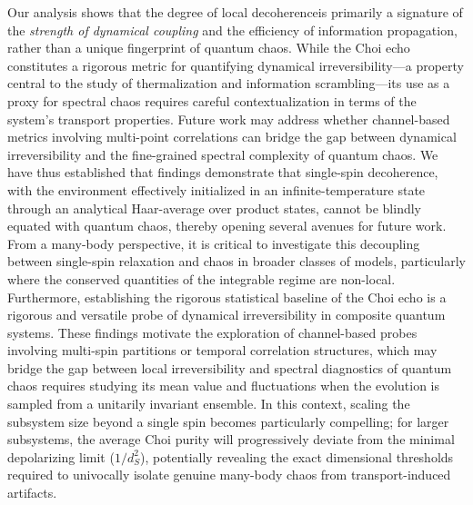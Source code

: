 \documentclass[pra,twocolumn,aps,showpacs,superscriptaddress,longbibliography]{revtex4-2}%
\providecommand{\DIFadd}[1]{{\protect\color{blue} \sf #1}} %
\providecommand{\DIFdel}[1]{{\protect\color{red} \scriptsize #1}} %
\providecommand{\DIFaddbegin}{} %
\providecommand{\DIFaddend}{} %
\providecommand{\DIFdelbegin}{} %
\providecommand{\DIFdelend}{} %
\begin{document}
Our \DIFdelbegin \DIFdel{analysis shows that the degree of local decoherenceis primarily a signature of the }\textit{\DIFdel{strength of dynamical coupling}} %
\DIFdel{and the efficiency of information propagation, rather than a unique fingerprint of quantum chaos. While the Choi echo constitutes a rigorous metric for quantifying dynamical irreversibility---a property central to the study of thermalization and information scrambling---its use as a proxy for spectral chaos requires careful contextualization in terms of the system's transport properties. Future work may address whether channel-based metrics involving multi-point correlations can bridge the gap between dynamical irreversibility and the fine-grained spectral complexity of quantum chaos.
We have thus established that }\DIFdelend \DIFaddbegin \DIFadd{findings demonstrate that single-spin decoherence, with the environment effectively initialized in an infinite-temperature state through an analytical Haar-average over product states, cannot be blindly equated with quantum chaos, thereby opening several avenues for future work. From a many-body perspective, it is critical to investigate this decoupling between single-spin relaxation and chaos in broader classes of models, particularly where the conserved quantities of the integrable regime are non-local. Furthermore, establishing the rigorous statistical baseline of }\DIFaddend the Choi echo \DIFdelbegin \DIFdel{is a rigorous and versatile probe of dynamical irreversibility in composite quantum systems. These findings motivate the exploration of channel-based probes involving multi-spin partitions or temporal correlation structures, which may bridge the gap between local irreversibility and spectral diagnostics of quantum chaos }\DIFdelend \DIFaddbegin \DIFadd{requires studying its mean value and fluctuations when the evolution is sampled from a unitarily invariant ensemble. In this context, scaling the subsystem size beyond a single spin becomes particularly compelling; for larger subsystems, the average Choi purity will progressively deviate from the minimal depolarizing limit ($1/d_S^2$), potentially revealing the exact dimensional thresholds required to univocally isolate genuine many-body chaos from transport-induced artifacts}\DIFaddend .
\end{document}
